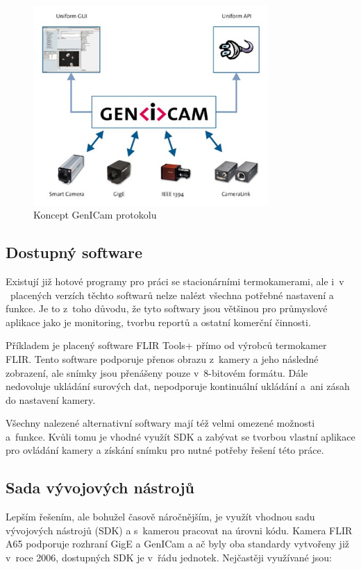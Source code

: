     \begin{figure}[h]
      \centering
      \includegraphics[width=0.8\textwidth]{images/genicam_protocol.jpg}
      \caption{Koncept GenICam protokolu \cite{genicamProtocolImage}}
      \label{fig:genicam_protocol}
	\end{figure}      
    
    \subsection{Dostupný software}
       Existují již hotové programy pro práci se stacionárními termokamerami, ale i~v ~placených verzích těchto softwarů nelze nalézt všechna potřebné nastavení a funkce. Je to z~toho důvodu, že tyto softwary jsou většinou pro průmyslové aplikace jako je monitoring, tvorbu reportů a ostatní komerční činnosti. 
       
       Příkladem je placený software FLIR Tools+ \cite{flirtools} přímo od výrobců termokamer FLIR. Tento software podporuje přenos obrazu z~kamery a jeho následné zobrazení, ale snímky jsou přenášeny pouze v~8-bitovém formátu. Dále nedovoluje ukládání surových dat, nepodporuje kontinuální ukládání a~ani zásah do nastavení kamery. 
       
       Všechny nalezené alternativní softwary mají též velmi omezené možnosti a~funkce. Kvůli tomu je vhodné využít SDK a zabývat se tvorbou vlastní aplikace pro ovládání kamery a získání snímku pro nutné potřeby řešení této práce. 
    
    \subsection{Sada vývojových nástrojů}\label{section:sdk}
    Lepším řešením, ale bohužel časově náročnějším, je využít vhodnou sadu vývojových nástrojů (SDK) a s~kamerou pracovat na úrovni kódu. Kamera FLIR A65 podporuje rozhraní GigE a GenICam a ač byly oba standardy vytvořeny již v~roce 2006, dostupných SDK je v~řádu jednotek. Nejčastěji využívané jsou:
      
